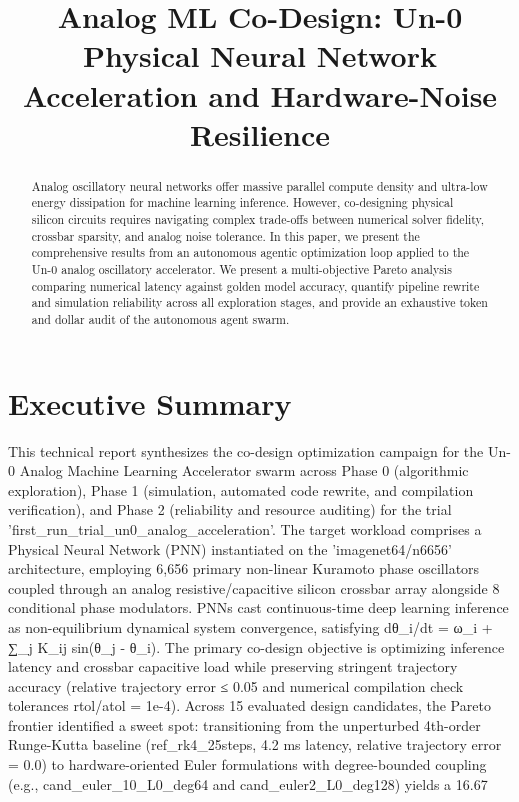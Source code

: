 \documentclass[10pt,conference]{IEEEtran}
\title{Analog ML Co-Design: Un-0 Physical Neural Network Acceleration and Hardware-Noise Resilience}
\author{
    \IEEEauthorblockN{Analog ML Co-Design Agentic Swarm}
    \IEEEauthorblockA{Autonomous AI Hardware Acceleration Framework\\
    Chia Multi-Agent Swarm for Physical Neuromorphic Architectures}
}
\begin{document}
\maketitle

\begin{abstract}
Analog oscillatory neural networks offer massive parallel compute density and ultra-low energy dissipation for machine learning inference. However, co-designing physical silicon circuits requires navigating complex trade-offs between numerical solver fidelity, crossbar sparsity, and analog noise tolerance. In this paper, we present the comprehensive results from an autonomous agentic optimization loop applied to the Un-0 analog oscillatory accelerator. We present a multi-objective Pareto analysis comparing numerical latency against golden model accuracy, quantify pipeline rewrite and simulation reliability across all exploration stages, and provide an exhaustive token and dollar audit of the autonomous agent swarm.
\end{abstract}

\section{Executive Summary}
This technical report synthesizes the co-design optimization campaign for the Un-0 Analog Machine Learning Accelerator swarm across Phase 0 (algorithmic exploration), Phase 1 (simulation, automated code rewrite, and compilation verification), and Phase 2 (reliability and resource auditing) for the trial 'first_run_trial_un0_analog_acceleration'. The target workload comprises a Physical Neural Network (PNN) instantiated on the 'imagenet64/n6656' architecture, employing 6,656 primary non-linear Kuramoto phase oscillators coupled through an analog resistive/capacitive silicon crossbar array alongside 8 conditional phase modulators. PNNs cast continuous-time deep learning inference as non-equilibrium dynamical system convergence, satisfying dθ_i/dt = ω_i + ∑_j K_ij sin(θ_j - θ_i). The primary co-design objective is optimizing inference latency and crossbar capacitive load while preserving stringent trajectory accuracy (relative trajectory error ≤ 0.05 and numerical compilation check tolerances rtol/atol = 1e-4). Across 15 evaluated design candidates, the Pareto frontier identified a sweet spot: transitioning from the unperturbed 4th-order Runge-Kutta baseline (ref_rk4_25steps, 4.2 ms latency, relative trajectory error = 0.0) to hardware-oriented Euler formulations with degree-bounded coupling (e.g., cand_euler_10_L0_deg64 and cand_euler2_L0_deg128) yields a 16.67%
\end{document}
